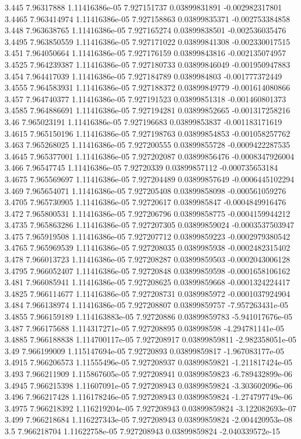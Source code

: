 {3.445 7.96317888 1.11416386e-05 7.927151737 0.03899831891 -0.002982317801
3.4465 7.963414974 1.11416386e-05 7.927158863 0.03899835371 -0.002753384858
3.448 7.963638765 1.11416386e-05 7.927165274 0.03899838501 -0.002536035476
3.4495 7.963850559 1.11416386e-05 7.927171022 0.03899841308 -0.002330017515
3.451 7.964050664 1.11416386e-05 7.927176159 0.03899843816 -0.002135074957
3.4525 7.964239387 1.11416386e-05 7.927180733 0.03899846049 -0.001950947883
3.454 7.964417039 1.11416386e-05 7.927184789 0.0389984803 -0.001777372449
3.4555 7.964583931 1.11416386e-05 7.927188372 0.03899849779 -0.001614080866
3.457 7.964740377 1.11416386e-05 7.927191523 0.03899851318 -0.001460801373
3.4585 7.964886691 1.11416386e-05 7.927194281 0.03899852665 -0.001317258216
3.46 7.965023191 1.11416386e-05 7.927196683 0.03899853837 -0.001183171619
3.4615 7.965150196 1.11416386e-05 7.927198763 0.03899854853 -0.001058257762
3.463 7.965268025 1.11416386e-05 7.927200555 0.03899855728 -0.0009422287535
3.4645 7.965377001 1.11416386e-05 7.927202087 0.03899856476 -0.0008347926004
3.466 7.96547745 1.11416386e-05 7.92720339 0.03899857112 -0.000735653184
3.4675 7.965569697 1.11416386e-05 7.927204489 0.03899857649 -0.0006445102294
3.469 7.965654071 1.11416386e-05 7.927205408 0.03899858098 -0.000561059276
3.4705 7.965730905 1.11416386e-05 7.92720617 0.0389985847 -0.0004849916476
3.472 7.965800531 1.11416386e-05 7.927206796 0.03899858775 -0.0004159944212
3.4735 7.965863286 1.11416386e-05 7.927207305 0.03899859024 -0.0003537503947
3.475 7.965919508 1.11416386e-05 7.927207712 0.03899859223 -0.0002979380542
3.4765 7.965969539 1.11416386e-05 7.927208035 0.0389985938 -0.0002482315402
3.478 7.966013723 1.11416386e-05 7.927208287 0.03899859503 -0.0002043006128
3.4795 7.966052407 1.11416386e-05 7.92720848 0.03899859598 -0.0001658106162
3.481 7.966085941 1.11416386e-05 7.927208625 0.03899859668 -0.0001324224417
3.4825 7.966114677 1.11416386e-05 7.927208731 0.0389985972 -0.0001037924904
3.484 7.966138974 1.11416386e-05 7.927208807 0.03899859757 -7.957263431e-05
3.4855 7.966159189 1.114163883e-05 7.92720886 0.03899859783 -5.941017676e-05
3.487 7.966175688 1.114317271e-05 7.927208895 0.038998598 -4.294781141e-05
3.4885 7.966188838 1.114700117e-05 7.927208917 0.03899859811 -2.982358051e-05
3.49 7.966199009 1.115147694e-05 7.92720893 0.03899859817 -1.967083177e-05
3.4915 7.966206573 1.11555496e-05 7.927208937 0.03899859821 -1.211817424e-05
3.493 7.966211909 1.115867605e-05 7.927208941 0.03899859823 -6.789432899e-06
3.4945 7.966215398 1.11607091e-05 7.927208943 0.03899859824 -3.303602096e-06
3.496 7.966217428 1.116178246e-05 7.927208943 0.03899859824 -1.274797749e-06
3.4975 7.966218392 1.116219204e-05 7.927208943 0.03899859824 -3.122082693e-07
3.499 7.966218684 1.116227343e-05 7.927208943 0.03899859824 -2.004420953e-08
3.5 7.966218704 1.11622758e-05 7.927208943 0.03899859824 -2.040339572e-15
}\leverhistory
{}\leversweep
